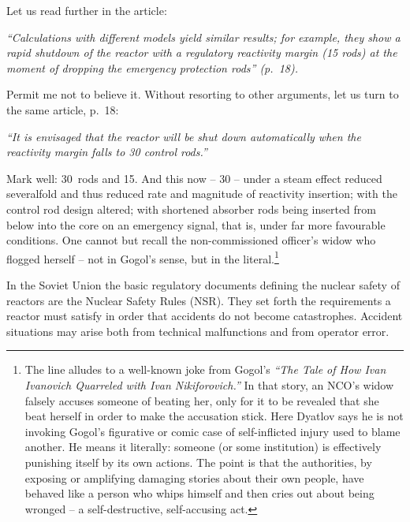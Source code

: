 \documentclass[openright]{bookest}
\begin{document}
Let us read further in the article:

\begin{personal}
\textit{``Calculations with different models yield similar results; for example, they show a rapid shutdown of the reactor with a regulatory reactivity margin (\num{15} rods) at the moment of dropping the emergency protection rods'' (p.~18).}
\end{personal}

Permit me not to believe it. Without resorting to other arguments, let us turn to the same article, p.~18:

\begin{personal}
\textit{``It is envisaged that the reactor will be shut down automatically when the reactivity margin falls to \num{30} control rods.''}
\end{personal}

Mark well: \num{30}~rods and \num{15}. And this now -- \num{30} -- under a steam effect reduced severalfold and thus reduced rate and magnitude of reactivity insertion; with the control rod design altered; with shortened absorber rods being inserted from below into the core on an emergency signal, that is, under far more favourable conditions. One cannot but recall the non-commissioned officer's widow who flogged herself -- not in Gogol's sense, but in the literal.\footnote{The line alludes to a well-known joke from Gogol's \textit{``The Tale of How Ivan Ivanovich Quarreled with Ivan Nikiforovich.''} In that story, an NCO's widow falsely accuses someone of beating her, only for it to be revealed that she beat herself in order to make the accusation stick. Here Dyatlov says he is not invoking Gogol's figurative or comic case of self-inflicted injury used to blame another. He means it literally: someone (or some institution) is effectively punishing itself by its own actions. The point is that the authorities, by exposing or amplifying damaging stories about their own people, have behaved like a person who whips himself and then cries out about being wronged -- a self-destructive, self-accusing act.}

In the Soviet Union the basic regulatory documents defining the nuclear safety of reactors are the Nuclear Safety Rules (NSR). They set forth the requirements a reactor must satisfy in order that accidents do not become catastrophes. Accident situations may arise both from technical malfunctions and from operator error.
\end{document}
